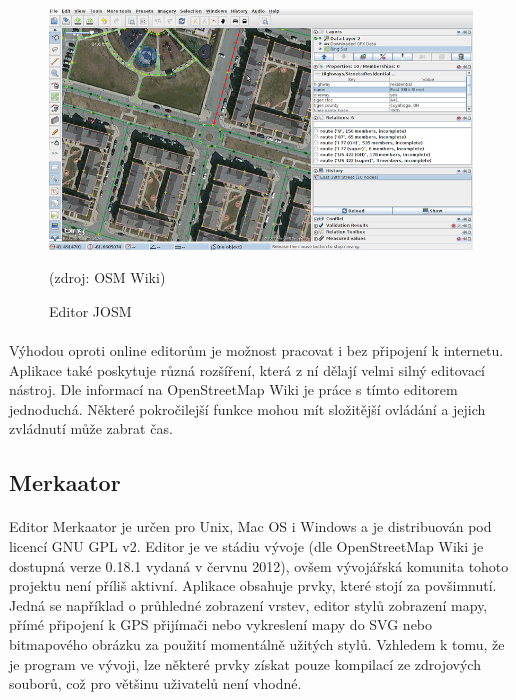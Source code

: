 \documentclass[11pt,a4paper,titlepage,oneside]{book}
\begin{document}
		\begin{figure}[!h]
			\begin{center}
				\includegraphics[width=12.6cm]{obrazky/josm_osm.png}
				\caption{Editor JOSM} (zdroj: OSM Wiki\cite{wiki_josm})
				\label{fig:josm_osm}
			\end{center}
		\end{figure}
			\paragraph{} Výhodou oproti online editorům je možnost pracovat i bez připojení k internetu. Aplikace také poskytuje různá rozšíření, která z ní dělají velmi silný editovací nástroj. Dle informací na OpenStreetMap Wiki\cite{wiki_josm} je práce s tímto editorem jednoduchá. Některé pokročilejší funkce mohou mít složitější ovládání a jejich zvládnutí může zabrat čas.

		\subsection{Merkaator}
			\paragraph{} Editor Merkaator je určen pro Unix, Mac OS i Windows a je distribuován pod licencí GNU \ac{GPL} v2. Editor je ve stádiu vývoje (dle OpenStreetMap Wiki je dostupná verze 0.18.1 vydaná v červnu 2012), ovšem vývojářská komunita tohoto projektu není příliš aktivní\cite{wiki_merkaator}. Aplikace obsahuje prvky, které stojí za povšimnutí. Jedná se například o průhledné zobrazení vrstev, editor stylů zobrazení mapy, přímé připojení k GPS přijímači nebo vykreslení mapy do \ac{SVG} nebo bitmapového obrázku za použití momentálně užitých stylů. Vzhledem k tomu, že je program ve vývoji, lze některé prvky získat pouze kompilací ze zdrojových souborů, což pro většinu uživatelů není vhodné.
\end{document}
